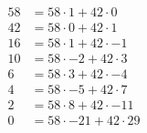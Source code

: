 \begin{align*}
	58 & = 58 \cdot 1 + 42 \cdot 0    \\
	42 & = 58 \cdot 0 + 42 \cdot 1    \\
	16 & = 58 \cdot 1 + 42 \cdot -1   \\
	10 & = 58 \cdot -2 + 42 \cdot 3   \\
	6  & = 58 \cdot 3 + 42 \cdot -4   \\
	4  & = 58 \cdot -5 + 42 \cdot 7   \\
	2  & = 58 \cdot 8 + 42 \cdot -11  \\
	0  & = 58 \cdot -21 + 42 \cdot 29 \\
\end{align*}
